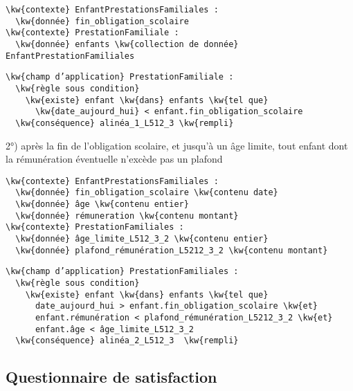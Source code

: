 \documentclass[12pt, french]{article}
\newcommand{\kw}[1]{\textbf{\textcolor{OliveGreen}{#1}}}
\newenvironment{metadata}{
  \begin{tcolorbox}[colframe=OliveGreen, title=\textcolor{black}{\texttt{Métadonnées}}, before skip=1em, after skip=1em]
}{
\end{tcolorbox}
}
\begin{document}
\begin{metadata}
\begin{Verbatim}[commandchars=\\\{\}]
\kw{contexte} EnfantPrestationsFamiliales :
  \kw{donnée} fin_obligation_scolaire
\kw{contexte} PrestationFamiliale :
  \kw{donnée} enfants \kw{collection de donnée} EnfantPrestationFamiliales
\end{Verbatim}
\end{metadata}

\begin{Verbatim}[commandchars=\\\{\}]
\kw{champ d’application} PrestationFamiliale :
  \kw{règle sous condition}
    \kw{existe} enfant \kw{dans} enfants \kw{tel que}
      \kw{date_aujourd_hui} < enfant.fin_obligation_scolaire
  \kw{conséquence} alinéa_1_L512_3 \kw{rempli}
\end{Verbatim}

2°) après la fin de l’obligation scolaire, et jusqu’à un âge limite, tout enfant dont la rémunération éventuelle n’excède pas un plafond

\begin{metadata}
\begin{Verbatim}[commandchars=\\\{\}]
\kw{contexte} EnfantPrestationsFamiliales :
  \kw{donnée} fin_obligation_scolaire \kw{contenu date}
  \kw{donnée} âge \kw{contenu entier}
  \kw{donnée} rémuneration \kw{contenu montant}
\kw{contexte} PrestationFamiliales :
  \kw{donnée} âge_limite_L512_3_2 \kw{contenu entier}
  \kw{donnée} plafond_rémunération_L5212_3_2 \kw{contenu montant}
\end{Verbatim}
\end{metadata}

\begin{Verbatim}[commandchars=\\\{\}]
\kw{champ d’application} PrestationFamiliales :
  \kw{règle sous condition}
    \kw{existe} enfant \kw{dans} enfants \kw{tel que}
      date_aujourd_hui > enfant.fin_obligation_scolaire \kw{et}
      enfant.rémunération < plafond_rémunération_L5212_3_2 \kw{et}
      enfant.âge < âge_limite_L512_3_2
  \kw{conséquence} alinéa_2_L512_3  \kw{rempli}
\end{Verbatim}

\subsection{Questionnaire de satisfaction}
\end{document}
